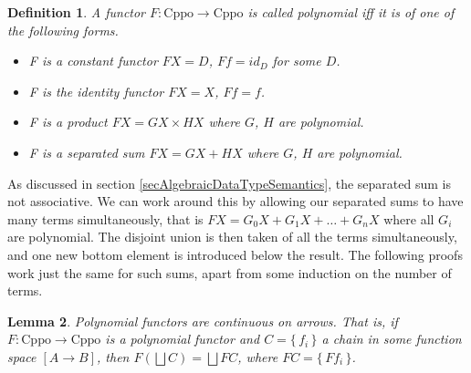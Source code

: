 \documentclass[a4paper]{article}
\newcommand{\arr}{\rightarrow}
\newcommand{\lub}{\bigsqcup}
\newcommand{\set}[1]{\{\,#1\,\}}
\newcommand{\Cppo}{\text{Cppo}}
\newcommand{\product}{\!\times\!}
\newtheorem{definition}{Definition}[section]
\newtheorem{lemma}[definition]{Lemma}
\begin{document}
\begin{definition}
A functor $F : \Cppo \arr \Cppo$ is called \emph{polynomial} iff it is of one of the following forms.
\begin{itemize}[noitemsep]
\item F is a constant functor $FX = D$, $Ff = id_D$ for some $D$.
\item F is the identity functor $FX = X$, $Ff = f$.
\item F is a product $FX = GX \product HX$ where $G$, $H$ are polynomial.
\item F is a separated sum $FX = GX + HX$ where $G$, $H$ are polynomial.
\end{itemize}
\end{definition}

As discussed in section \ref{secAlgebraicDataTypeSemantics}, the separated sum
is not associative. We can work around this by allowing our separated sums to
have many terms simultaneously, that is $FX = G_0X + G_1X + \ldots + G_nX$ where
all $G_i$ are polynomial. The disjoint union is then taken of all the terms
simultaneously, and one new bottom element is introduced below the result. The
following proofs work just the same for such sums, apart from some induction on
the number of terms.

\begin{lemma} \label{lemPolynomialFunctorsContinuous}
Polynomial functors are continuous on arrows. That is, if $F : \Cppo \arr \Cppo$
is a polynomial functor and $C = \set{f_i}$ a chain in some function space $[A
\arr B]$, then $F(\lub C) = \lub FC$, where $FC = \set{Ff_i}$.
\end{lemma}
\end{document}
